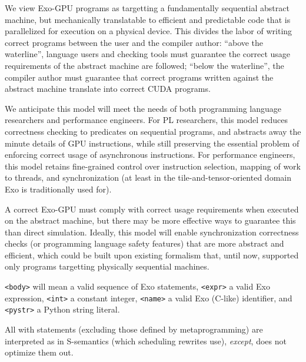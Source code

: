 We view Exo-GPU programs as targetting a fundamentally sequential abstract machine, but mechanically translatable to efficient and predictable code that is parallelized for execution on a physical device.
This divides the labor of writing correct programs between the user and the compiler author: ``above the waterline'', language users and checking tools must guarantee the correct usage requirements of the abstract machine are followed; ``below the waterline'', the compiler author must guarantee that correct programs written against the abstract machine translate into correct CUDA programs.

\filbreak
We anticipate this model will meet the needs of both programming language researchers and performance engineers.
For PL researchers, this model reduces correctness checking to predicates on sequential programs, and abstracts away the minute details of GPU instructions, while still preserving the essential problem of enforcing correct usage of asynchronous instructions.
For performance engineers, this model retains fine-grained control over instruction selection, mapping of work to threads, and synchronization (at least in the tile-and-tensor-oriented domain Exo is traditionally used for).

\filbreak
A correct Exo-GPU must comply with correct usage requirements when executed on the abstract machine, but there may be more effective ways to guarantee this than direct simulation.
Ideally, this model will enable synchronization correctness checks (or programming language safety features) that are more abstract and efficient, which could be built upon existing formalism that, until now, supported only programs targetting physically sequential machines.

\newpage
{}

\texttt{<body>} will mean a valid sequence of Exo statements, \texttt{<expr>} a valid Exo expression, \texttt{<int>} a constant integer, \texttt{<name>} a valid Exo (C-like) identifier, and \texttt{<pystr>} a Python string literal.


All with statements (excluding those defined by metaprogramming) are interpreted as  in S-semantics (which scheduling rewrites use), \textit{except},  does not optimize them out.


\filbreak
{}


\filbreak
{}

